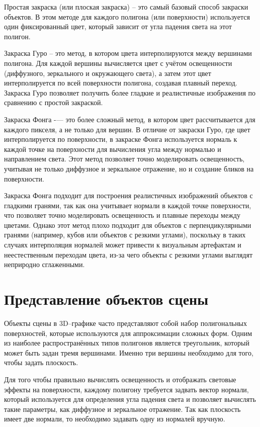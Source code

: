 Простая закраска (или плоская закраска) -- это самый базовый способ закраски объектов. В этом методе для каждого полигона (или поверхности) используется один фиксированный цвет, который зависит от угла падения света на этот полигон.

Закраска Гуро -- это метод, в котором цвета интерполируются между вершинами полигона. Для каждой вершины вычисляется цвет с учётом освещенности (диффузного, зеркального и окружающего света), а затем этот цвет интерполируется по всей поверхности полигона, создавая плавный переход. Закраска Гуро позволяет получить более гладкие и реалистичные изображения по сравнению с простой закраской.

Закраска Фонга -— это более сложный метод, в котором цвет рассчитывается для каждого пикселя, а не только для вершин. В отличие от закраски Гуро, где цвет интерполируется по поверхности, в закраске Фонга используется нормаль к каждой точке на поверхности для вычисления угла между нормалью и направлением света. Этот метод позволяет точно моделировать освещенность, учитывая не только диффузное и зеркальное отражение, но и создание бликов на поверхности.

Закраска Фонга подходит для построения реалистичных изображений объектов с гладкими гранями, так как она учитывает нормали в каждой точке поверхности, что позволяет точно моделировать освещенность и плавные переходы между цветами. Однако этот метод плохо подходит для объектов с перпендикулярными гранями (например, кубов или объектов с резкими углами), поскольку в таких случаях интерполяция нормалей может привести к визуальным артефактам и неестественным переходам цвета, из-за чего объекты с резкими углами выглядят неприродно сглаженными.

\section{Представление объектов сцены}
Объекты сцены в 3D--графике часто представляют собой набор полигональных поверхностей, которые используются для аппроксимации сложных форм. Одним из наиболее распространённых типов полигонов является треугольник, который может быть задан тремя вершинами. Именно три вершины необходимо для того, чтобы задать плоскость.

Для того чтобы правильно вычислять освещенность и отображать световые эффекты на поверхности, каждому полигону требуется задвать вектор нормали, который используется для определения угла падения света и позволяет вычислять такие параметры, как диффузное и зеркальное отражение. Так как плоскость имеет две нормали, то необходимо задавать одну из нормалей вручную. 

